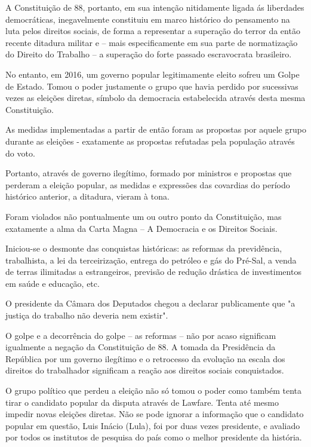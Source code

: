 A Constituição de 88, portanto, em sua intenção nitidamente ligada ás
liberdades democráticas, inegavelmente constituiu em marco histórico do
pensamento na luta pelos direitos sociais, de forma a representar a
superação do terror da então recente ditadura militar e -- mais
especificamente em sua parte de normatização do Direito do Trabalho -- a
superação do forte passado escravocrata brasileiro.

No entanto, em 2016, um governo popular legitimamente eleito sofreu um
Golpe de Estado. Tomou o poder justamente o grupo que havia perdido por
sucessivas vezes as eleições diretas, símbolo da democracia estabelecida
através desta mesma Constituição.

As medidas implementadas a partir de então foram as propostas por aquele
grupo durante as eleições - exatamente as propostas refutadas pela
população através do voto.

Portanto, através de governo ilegítimo, formado por ministros e
propostas que perderam a eleição popular, as medidas e expressões das
covardias do período histórico anterior, a ditadura, vieram à tona.

Foram violados não pontualmente um ou outro ponto da Constituição, mas
exatamente a alma da Carta Magna -- A Democracia e os Direitos Sociais.

Iniciou-se o desmonte das conquistas históricas: as reformas da
previdência, trabalhista, a lei da terceirização, entrega do petróleo e
gás do Pré-Sal, a venda de terras ilimitadas a estrangeiros, previsão de
redução drástica de investimentos em saúde e educação, etc.

O presidente da Câmara dos Deputados chegou a declarar publicamente que
"a justiça do trabalho não deveria nem existir".

O golpe e a decorrência do golpe -- as reformas -- não por acaso
significam igualmente a negação da Constituição de 88. A tomada da
Presidência da República por um governo ilegítimo e o retrocesso da
evolução na escala dos direitos do trabalhador significam a reação aos
direitos sociais conquistados.

O grupo político que perdeu a eleição não só tomou o poder como também
tenta tirar o candidato popular da disputa através de Lawfare. Tenta até
mesmo impedir novas eleições diretas. Não se pode ignorar a informação
que o candidato popular em questão, Luis Inácio (Lula), foi por duas
vezes presidente, e avaliado por todos os institutos de pesquisa do país
como o melhor presidente da história.

